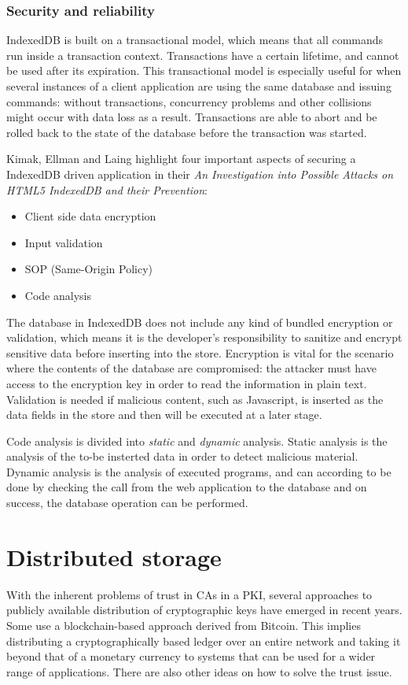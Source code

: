 \subsubsection{Security and reliability}
\label{subsec:security}
IndexedDB is built on a transactional model, which means that all commands run inside a transaction context. Transactions have a certain lifetime, and cannot be used after its expiration. This transactional model is especially useful for when several instances of a client application are using the same database and issuing commands: without transactions, concurrency problems and other collisions might occur with data loss as a result. Transactions are able to abort and be rolled back to the state of the database before the transaction was started.

Kimak, Ellman and Laing highlight four important aspects of securing a IndexedDB driven application in their \emph{An Investigation into Possible Attacks on HTML5 IndexedDB and their Prevention}\cite{IndexedDBSecurity:2012:Online}:

\begin{itemize}
  \item Client side data encryption
  \item Input validation
  \item SOP (Same-Origin Policy)
  \item Code analysis
\end{itemize}

The database in IndexedDB does not include any kind of bundled encryption or validation, which means it is the developer's responsibility to sanitize and encrypt sensitive data before inserting into the store. Encryption is vital for the scenario where the contents of the database are compromised: the attacker must have access to the encryption key in order to read the information in plain text. Validation is needed if malicious content, such as Javascript, is inserted as the data fields in the store and then will be executed at a later stage.

Code analysis is divided into \emph{static} and \emph{dynamic} analysis. Static analysis is the analysis of the to-be insterted data in order to detect malicious material. Dynamic analysis is the analysis of executed programs, and can according to \cite{IndexedDBSecurity:2012:Online} be done by checking the call from the web application to the database and on success, the database operation can be performed.

\section{Distributed storage}
With the inherent problems of trust in CAs in a PKI, several approaches to publicly available distribution of cryptographic keys have emerged in recent years. Some use a blockchain-based approach derived from Bitcoin. This implies distributing a cryptographically based ledger over an entire network and taking it beyond that of a monetary currency to systems that can be used for a wider range of applications. There are also other ideas on how to solve the trust issue.

